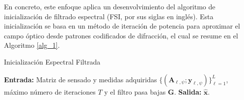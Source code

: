 

En concreto, este enfoque aplica un desenvolvimiento del algoritmo de inicialización de filtrado espectral (FSI, por sus siglas en inglés). Esta inicialización se basa en un método de iteración de potencia para aproximar el campo óptico desde patrones codificados de difracción, el cual se resume en el Algoritmo \ref{alg_1}.

\begin{algoritmo}[!h]
    \caption{Inicialización Espectral Filtrada}%
    \textbf{Entrada:} Matriz de sensado y medidas adquiridas $\{(\mathbf{A}_{\ell, \psi};\mathbf{y}_{\ell, \psi})\}_{\ell=1}^L$, máximo número de iteraciones $T$ y el filtro pasa bajas $ \mathbf{G}$.\newline
    \textbf{Salida:} $\hat{\mathbf{x}}$.
    \begin{algorithmic}[1]
        
        \EndFor
    \end{algorithmic}
    \label{alg_1}
\end{algoritmo}


